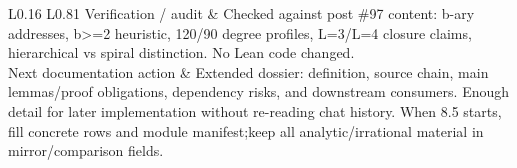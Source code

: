 \begin{longtable}{L{0.16\linewidth} L{0.81\linewidth}}
\hline\addlinespace[0.20em]
Verification /\allowbreak{} audit & Checked against post \#97 content: b-ary addresses, b>=2 heuristic, 120/\allowbreak{}90 degree profiles, L=3/\allowbreak{}L=4 closure claims, hierarchical vs spiral distinction. No Lean code changed.\\
\hline\addlinespace[0.20em]
Next documentation action & Extended dossier: definition, source chain, main lemmas/\allowbreak{}proof obligations, dependency risks, and downstream consumers. Enough detail for later implementation without re-reading chat history. When 8.5 starts, fill concrete rows and module manifest;\newline keep all analytic/\allowbreak{}irrational material in mirror/\allowbreak{}comparison fields.\\
\hline\addlinespace[0.20em]
\end{longtable}
